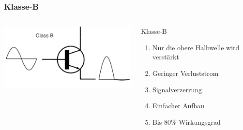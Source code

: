 \begin{frame}
    \frametitle{Klasse-B}
            \begin{columns}[c]
        \column[c]{4cm}
        \begin{center}
            \includegraphics[width=1\textwidth]{a07/Electronic_Amplifier_Class_B_fixed.png}\\
            \tiny \hyperlink{refs}{\cite{wm}}
    \end{center}
    \column{5cm} \large
    \begin{block}{Klasse-B}
	    \begin{enumerate} 
			\item Nur die obere Halbwelle wird verstärkt
			\item Geringer Verluststrom
			\item Signalverzerrung
			\item Einfacher Aufbau
			\item Bis $80\%$ Wirkungsgrad
    	\end{enumerate}
    \end{block}
    \end{columns}
\end{frame}

